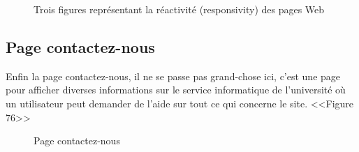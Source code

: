 \documentclass[12pt]{report}
\begin{document}
\begin{figure}[h]
\begin{minipage}{.33\textwidth}
\end{minipage}
  \caption{Trois figures représentant la réactivité (responsivity) des pages Web}
\end{figure}

\newpage

\subsection{Page contactez-nous}

Enfin la page contactez-nous, il ne se passe pas grand-chose ici, c'est une page pour afficher diverses informations sur le service informatique de l'université où un utilisateur peut demander de l'aide sur tout ce qui concerne le site. <<Figure 76>>

\vspace{0.3in}

\begin{figure}[h]
\centering
\caption{Page contactez-nous}
\end{figure}
\end{document}
